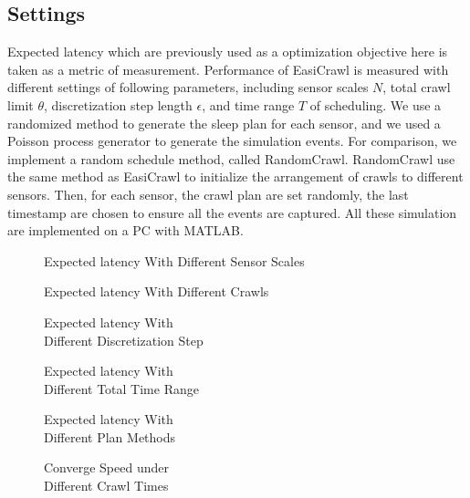 \documentclass[conference]{IEEEtran}
\begin{document}
\subsection{Settings}
Expected latency which are previously used as a optimization objective here is taken as a metric of measurement.
Performance of EasiCrawl is measured with different settings of following parameters, including sensor scales $N$, total crawl limit $\theta$, discretization step length $\epsilon$, and time range $T$ of scheduling. 
We use a randomized method to generate the sleep plan for each sensor, and we used a Poisson process generator to generate the simulation events.
For comparison, we implement a random schedule method, called RandomCrawl. 
RandomCrawl use the same method as EasiCrawl to initialize the arrangement of crawls to different sensors. 
Then, for each sensor, the crawl plan are set randomly, the last timestamp are chosen to ensure all the events are captured. 
All these simulation are implemented on a PC with MATLAB.
\begin{figure*}
		
		\captionsetup{justification=centering}
		\caption{Expected latency With Different Sensor Scales}
		\label{fig:test1_sensorscale}
	\endminipage\hfill
		
		\captionsetup{justification=centering}
		\caption{Expected latency With Different Crawls}
		\label{fig:test2_totalcrawl}
	\endminipage\hfill
		
		\captionsetup{justification=centering}
		\caption{Expected latency With \\Different Discretization Step}
		\label{fig:test3_discretestep}
	\endminipage
	
		
		\captionsetup{justification=centering}
		\caption{Expected latency With \\Different Total Time Range}
		\label{fig:test4_timerange}
	\endminipage\hfill
		
		\captionsetup{justification=centering}
		\caption{Expected latency With \\Different Plan Methods}
		\label{fig:test5_sensortype}
	\endminipage\hfill
		
		\captionsetup{justification=centering}
		\caption{Converge Speed under \\Different Crawl Times}
		\label{fig:test6_convergespeed}
	\endminipage	
	\vspace{-1.0em}
\end{figure*}
\end{document}
